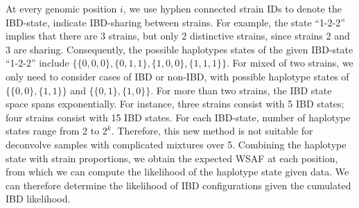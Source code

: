 \documentclass{article}
\begin{document}
At every genomic position $i$, we use hyphen connected strain IDs to denote the IBD-state, indicate IBD-sharing between strains. For example, the state ``1-2-2'' implies that there are 3 strains, but only 2 distinctive strains, since strains 2 and 3 are sharing. Consequently, the possible haplotypes states of the given IBD-state ``1-2-2'' include
 $\{\{0,0,0\}, \{0,1,1\}, \{1,0,0\}, \{1,1,1\}\}$. For mixed of two strains, we only need to consider cases of IBD or non-IBD, with possible haplotype states of $\{\{0,0\}, \{1,1\}\}$ and $\{\{0,1\}, \{1,0\}\}$. For more than two strains, the IBD state space spans exponentially. For instance, three strains consist with 5 IBD states; four strains consist with 15 IBD states. For each IBD-state, number of haplotype states range from 2 to $2^{k}$. Therefore, this new method is not suitable for deconvolve samples with complicated mixtures over 5. Combining the haplotype state with strain proportions, we obtain the expected WSAF at each position, from which we can compute the likelihood of the haplotype state given data. We can therefore determine the likelihood of IBD configurations given the cumulated IBD likelihood.








\end{document}
